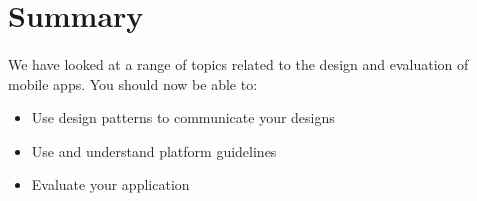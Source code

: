 \section{Summary}
\paragraph{} We have looked at a range of topics related to the design and evaluation of mobile apps. You should now be able to:

\begin{itemize}
\item Use design patterns to communicate your designs
\item Use and understand platform guidelines
\item Evaluate your application
\end{itemize}


